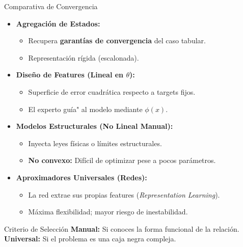 \documentclass[xcolor=dvipsnames, handout]{beamer}
\begin{document}
\begin{frame}{Comparativa de Convergencia}
\small
\begin{itemize}
    \item \textbf{Agregaci\'on de Estados:}
    \begin{itemize}
        \item Recupera \textbf{garant\'ias de convergencia} del caso tabular.
        \item Representaci\'on r\'igida (escalonada).
    \end{itemize}
    
    \item \textbf{Dise\~no de Features (Lineal en $\theta$):}
    \begin{itemize}
        \item Superficie de error cuadr\'atica respecto a targets fijos.
        \item El experto gu\'ia" al modelo mediante $\phi(x)$.
    \end{itemize}

    \item \textbf{Modelos Estructurales (No Lineal Manual):}
    \begin{itemize}
        \item Inyecta leyes f\'isicas o l\'imites estructurales.
        \item \textbf{No convexo:} Dif\'icil de optimizar pese a pocos par\'ametros.
    \end{itemize}

    \item \textbf{Aproximadores Universales (Redes):}
    \begin{itemize}
        \item La red extrae sus propias features (\textit{Representation Learning}).
        \item M\'axima flexibilidad; mayor riesgo de inestabilidad.
    \end{itemize}
\end{itemize}

\begin{block}{Criterio de Selecci\'on}
    \textbf{Manual:} Si conoces la forma funcional de la relaci\'on. \\
    \textbf{Universal:} Si el problema es una caja negra compleja.
\end{block}
\end{frame}
\end{document}
